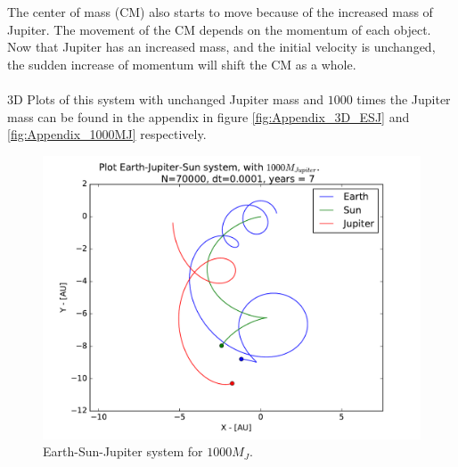\documentclass{article}
\begin{document}
The center of mass (CM) also starts to move because of the increased mass of Jupiter. The movement of the CM depends on the momentum of each object. Now that Jupiter has an increased mass, and the initial velocity is unchanged, the sudden increase of momentum will shift the CM as a whole. \\\\
3D Plots of this system with unchanged Jupiter mass and $1000$ times the Jupiter mass can be found in the appendix in figure \ref{fig:Appendix_3D_ESJ} and \ref{fig:Appendix_1000MJ} respectively. \\
\begin{figure}[!h]
\centering
\includegraphics[width=\linewidth]{Plots/Earth_Sun_Jupiter_1000MJ.pdf}
\caption{Earth-Sun-Jupiter system for $1000M_J$.}
\label{fig:ESJ_1000MJ}
\end{figure}

\FloatBarrier
\end{document}
